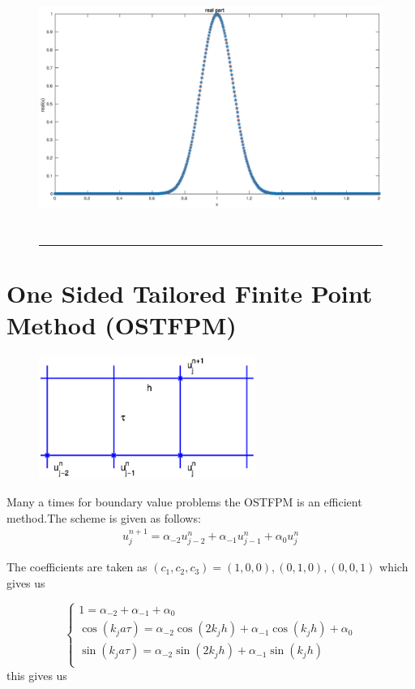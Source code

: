 \begin{figure}[htbp]
	\centering
		\includegraphics[height=8cm]{Figures/real_CTFPM.eps}\\
		\rule{35em}{0.5pt}
	\caption[RCTFPM imaginary part]{}
\end{figure}


\clearpage

\section{One Sided Tailored Finite Point Method (OSTFPM)}
\begin{figure}[htbp]
	\centering
		\includegraphics[height=4cm]{Figures/OSTFPM_mesh.eps}\\
	\caption[RCTFPM imaginary part]{}
\end{figure}
Many a times for boundary value problems the OSTFPM is an efficient method.The scheme is given as follows:
\begin{align}
 u_{j}^{n+1} = \alpha_{-2}u_{j-2}^{n} + \alpha_{-1}u_{j-1}^{n} + \alpha_{0}u_{j}^{n}
\end{align}

The coefficients are taken as $(c_1,c_2,c_3) = (1,0,0),(0,1,0),(0,0,1)$ which gives us

\[ \begin{cases} 
      1 = \alpha_{-2} + \alpha_{-1} + \alpha_{0} \\
      \cos(k_{j}a\tau) = \alpha_{-2}\cos(2k_{j}h) +\alpha_{-1}\cos(k_{j} h) + \alpha_{0}\\
      \sin(k_{j}a\tau) =  \alpha_{-2}\sin(2k_{j}h) + \alpha_{-1}\sin(k_{j}h)\\
   \end{cases}
\]
this gives us

